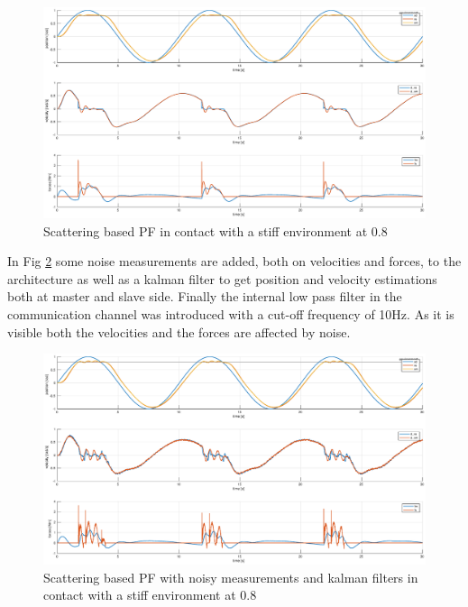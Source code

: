 \documentclass[a4paper,12pt]{article}
\begin{document}
\begin{figure}[H]
    \begin{center}
        \hspace*{-4.5cm}
        \includegraphics[scale=0.5]{images/scat_pf_contact.eps}
    \end{center}
    \caption{Scattering based PF in contact with a stiff environment at 0.8}
    \label{fig:scat_pf_contact}
\end{figure}

In Fig \ref{fig:scat_pf_contact_kalman} some noise measurements are added, both on velocities and forces, to the architecture as well as a kalman filter to get position and velocity estimations both at master and slave side. Finally the internal low pass filter in the communication channel was introduced with a cut-off frequency of 10Hz. As it is visible both the velocities and the forces are affected by noise.

\begin{figure}[H]
    \begin{center}
        \hspace*{-4.5cm}
        \includegraphics[scale=0.5]{images/scatt_pf_contact_kalman.eps}
    \end{center}
    \caption{Scattering based PF with noisy measurements and kalman filters in contact with a stiff environment at 0.8}
    \label{fig:scat_pf_contact_kalman}
\end{figure}
\end{document}
